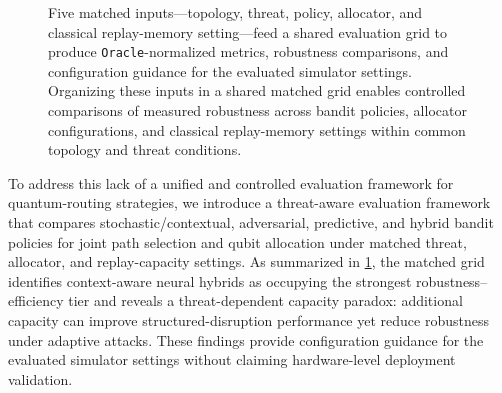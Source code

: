 \documentclass[10pt,journal]{IEEEtran}
\begin{document}
\begin{figure}[ht!]
{%
}
\caption{Five matched inputs---topology, threat, policy, allocator, and classical replay-memory setting---feed a shared evaluation grid to produce \texttt{Oracle}-normalized metrics, robustness comparisons, and configuration guidance for the evaluated simulator settings. Organizing these inputs in a shared matched grid enables controlled comparisons of measured robustness across bandit policies, allocator configurations, and classical replay-memory settings within common topology and threat conditions.}
\label{fig:framework}
\end{figure}

To address this lack of a unified and controlled evaluation framework for quantum-routing strategies, we introduce a threat-aware evaluation framework that compares stochastic/contextual, adversarial, predictive, and hybrid bandit policies for joint path selection and qubit allocation under matched threat, allocator, and replay-capacity settings. As summarized in \cref{fig:framework}, the matched grid identifies context-aware neural hybrids as occupying the strongest robustness--efficiency tier and reveals a threat-dependent capacity paradox: additional capacity can improve structured-disruption performance yet reduce robustness under adaptive attacks. These findings provide configuration guidance for the evaluated simulator settings without claiming hardware-level deployment validation.
\end{document}
